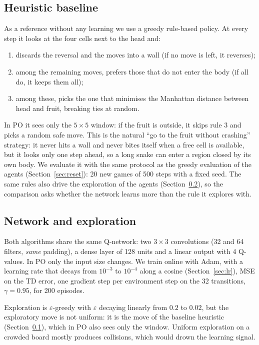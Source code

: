 \documentclass{article}
\begin{document}
\subsection{Heuristic baseline}
\label{sec:baseline}
As a reference without any learning we use a greedy rule-based policy. At every step it looks at the four cells next to the head and:
\begin{enumerate}
\item discards the reversal and the moves into a wall (if no move is left, it reverses);
\item among the remaining moves, prefers those that do not enter the body (if all do, it keeps them all);
\item among these, picks the one that minimises the Manhattan distance between head and fruit, breaking ties at random.
\end{enumerate}
In PO it sees only the $5\times5$ window: if the fruit is outside, it skips rule 3 and picks a random safe move.
This is the natural ``go to the fruit without crashing'' strategy: it never hits a wall and never bites itself when a free cell is available, but it looks only one step ahead, so a long snake can enter a region closed by its own body.
We evaluate it with the same protocol as the greedy evaluation of the agents (Section~\ref{sec:reset}): 20 new games of 500 steps with a fixed seed.
The same rules also drive the exploration of the agents (Section~\ref{sec:netexp}), so the comparison asks whether the network learns more than the rule it explores with.

\subsection{Network and exploration}
\label{sec:netexp}
Both algorithms share the same Q-network: two $3\times3$ convolutions (32 and 64 filters, \emph{same} padding), a dense layer of 128 units and a linear output with 4 Q-values.
In PO only the input size changes.
We train online with Adam, with a learning rate that decays from $10^{-3}$ to $10^{-4}$ along a cosine (Section~\ref{sec:lr}), MSE on the TD error, one gradient step per environment step on the 32 transitions, $\gamma=0.95$, for 200 episodes.

Exploration is $\varepsilon$-greedy with $\varepsilon$ decaying linearly from $0.2$ to $0.02$, but the exploratory move is not uniform: it is the move of the baseline heuristic (Section~\ref{sec:baseline}), which in PO also sees only the window.
Uniform exploration on a crowded board mostly produces collisions, which would drown the learning signal.
\end{document}
